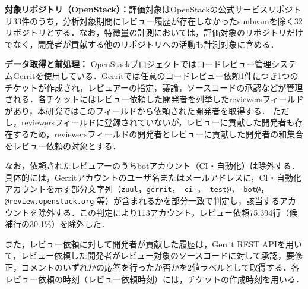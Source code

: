 \documentclass[submit]{ipsj}
\newcommand{\todo}[1]{\colorbox{yellow}{{\bf TODO}:}{\color{red} {\textbf{[#1]}}}}
\begin{document}
\noindent\textbf{対象リポジトリ（OpenStack）：}評価対象はOpenStackの公式サービスリポジトリ33件のうち，分析対象期間にレビュー履歴が存在しなかったsunbeamを除く32リポジトリとする．なお，特徴量の計測においては，評価対象のリポジトリだけでなく，開発者が貢献する他のリポジトリへの活動も計測対象に含める．

\noindent\textbf{データ取得と前処理：}
OpenStackプロジェクトではコードレビュー管理システムGerritを使用している．Gerritでは任意のコードレビュー依頼1件につき1つのチケットが作成され，レビュアーの指定，議論，ソースコードの承認などが管理される．各チケットにはレビュー依頼した開発者を列挙したreviewersフィールドがあり，本研究ではこのフィールドから依頼された開発者を取得する．
ただし，reviewersフィールドに登録されていないが，レビューに貢献した開発者も存在するため，reviewersフィールドの開発者とレビューに貢献した開発者の和集合をレビュー依頼の対象とする．

なお，依頼されたレビュアーのうちbotアカウント（CI・自動化）は除外する．具体的には，Gerritアカウントのユーザ名またはメールアドレスに，CI・自動化アカウントを示す部分文字列（\texttt{zuul}，\texttt{gerrit}，\texttt{-ci-}，\texttt{-test@}，\texttt{-bot@}，\texttt{@review.openstack.org} 等）が含まれるかを部分一致で判定し，該当するアカウントを除外する．この判定により113アカウント，レビュー依頼75,394行（候補行の30.1\%）を除外した．

また，レビュー依頼に対して開発者が貢献した履歴は，Gerrit REST APIを用いて，レビュー依頼した開発者がレビュー対象のソースコードに対して承認，要修正，コメントのいずれかの応答を行ったか否かを2値ラベルとして取得する．各レビュー依頼の時刻（レビュー依頼時刻）には，チケットの作成時刻を用いる．
\end{document}
